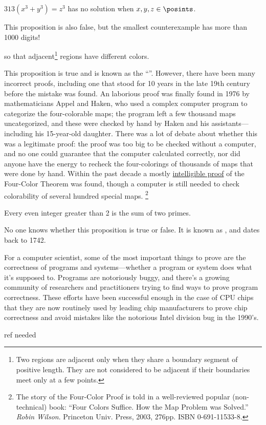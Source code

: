 \begin{proposition}
$313 (x^3 + y^3) = z^3$ has no solution when $x, y, z\in\posints$.
\end{proposition}

This proposition is also false, but the smallest counterexample has
more than 1000 digits!

\begin{proposition}\label{4colorprop}
 so that
adjacent\footnote{Two regions are adjacent only when they share a boundary
segment of positive length.  They are not considered to be adjacent if
their boundaries meet only at a few points.} regions have different
colors.
\end{proposition}

This proposition is true and is known as the ``''.  However, there have been many incorrect proofs, including
one that stood for 10 years in the late 19th century before the mistake
was found.  An laborious proof was finally found in 1976 by mathematicians
Appel and Haken, who used a complex computer program to categorize the
four-colorable maps; the program left a few thousand maps uncategorized,
and these were checked by hand by Haken and his assistants---including his
15-year-old daughter.  There was a lot of debate about whether this was a
legitimate proof: the proof was too big to be checked without a computer,
and no one could guarantee that the computer calculated correctly, nor did
anyone have the energy to recheck the four-colorings of thousands of maps
that were done by hand.  Within the past decade a mostly
\href{http://www.math.gatech.edu/~thomas/FC/fourcolor.html}{intelligible
  proof} of the Four-Color Theorem was found, though a computer is still
needed to check colorability of several hundred special maps.
\footnote{The story of the Four-Color Proof is told in a well-reviewed
  popular (non-technical) book: ``Four Colors Suffice.  How the Map
  Problem was Solved.'' \emph{Robin Wilson}.  Princeton Univ. Press, 2003,
  276pp. ISBN 0-691-11533-8.}

\begin{proposition}[Goldbach]
Every even integer greater than 2 is the sum of two primes.
\end{proposition}

No one knows whether this proposition is true or false.  It is known as
, and dates back to 1742.

For a computer scientist, some of the most important things to prove are
the correctness of programs and systems---whether a program or system
does what it's supposed to.  Programs are notoriously buggy, and there's a
growing community of researchers and practitioners trying to find ways to
prove program correctness.  These efforts have been successful enough in
the case of CPU chips that they are now routinely used by leading chip
manufacturers to prove chip correctness and avoid mistakes like the
notorious Intel division bug in the 1990's.
\begin{editingnotes}
ref needed
\end{editingnotes}


